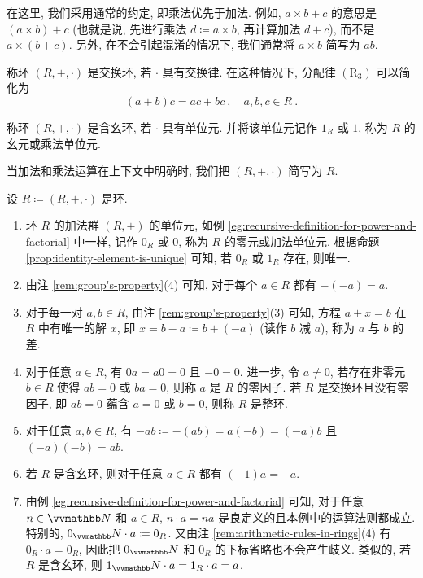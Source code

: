 在这里, 我们采用通常的约定, 即乘法优先于加法. 例如, \(a \times b + c\) 的意思是 \((a \times b) + c\) (也就是说, 先进行乘法 \(d \coloneqq a \times b\), 再计算加法 \(d + c\)), 而不是 \(a \times (b + c)\). 另外, 在不会引起混淆的情况下, 我们通常将 \(a \times b\) 简写为 \(a b\).

\begin{definition}[交换环]
    称环 \((R, +, \cdot)\) 是交换环, 若 \(\cdot\) 具有交换律. 在这种情况下, 分配律 \hyperref[ax:ring]{\((\mathrm R_3)\)} 可以简化为
    \[
        (a + b) c = a c + b c\ ,\quad a, b, c \in R\ .
    \]
\end{definition}

\begin{definition}[含幺环]
    称环 \((R, +, \cdot)\) 是含幺环, 若 \(\cdot\) 具有单位元. 并将该单位元记作 \(1_R\) 或 \(1\), 称为 \(R\) 的幺元或乘法单位元.
\end{definition}

当加法和乘法运算在上下文中明确时, 我们把 \((R, +, \cdot)\) 简写为 \(R\).

\begin{remark}\label{rem:arithmetic-rules-in-rings}
    设 \(R \coloneqq (R, +, \cdot)\) 是环.
    \begin{enumerate}
        \item 环 \(R\) 的加法群 \((R, +)\) 的单位元, 如例 \ref{eg:recursive-definition-for-power-and-factorial} 中一样, 记作 \(0_R\) 或 \(0\), 称为 \(R\) 的零元或加法单位元. 根据命题 \ref{prop:identity-element-is-unique} 可知, 若 \(0_R\) 或 \(1_R\) 存在, 则唯一.
        \item 由注 \ref{rem:group's-property}(4) 可知, 对于每个 \(a \in R\) 都有 \(- (- a) = a\).
        \item 对于每一对 \(a, b \in R\), 由注 \ref{rem:group's-property}(3) 可知, 方程 \(a + x = b\) 在 \(R\) 中有唯一的解 \(x\), 即 \(x = b - a \coloneqq b + (- a)\) (读作 \(b\) 减 \(a\)), 称为 \(a\) 与 \(b\) 的差.
        \item 对于任意 \(a \in R\), 有 \(0 a = a 0 = 0\) 且 \(- 0 = 0\). 进一步, 令 \(a \neq 0\), 若存在非零元 \(b \in R\) 使得 \(a b = 0\) 或 \(b a = 0\), 则称 \(a\) 是 \(R\) 的零因子. 若 \(R\) 是交换环且没有零因子, 即 \(a b = 0\) 蕴含 \(a = 0\) 或 \(b = 0\), 则称 \(R\) 是整环.
        \item 对于任意 \(a, b \in R\), 有 \(- a b \coloneqq - (a b) = a (- b) = (- a) b\) 且 \((- a) (- b) = a b\).
        \item 若 \(R\) 是含幺环, 则对于任意 \(a \in R\) 都有 \((- 1) a = - a\).
        \item 由例 \ref{eg:recursive-definition-for-power-and-factorial} 可知, 对于任意 \(n \in \N\) 和 \(a \in R\), \(n \cdot a = n a\) 是良定义的且本例中的运算法则都成立. 特别的, \(0_\N \cdot a \coloneqq 0_R\). 又由注 \ref{rem:arithmetic-rules-in-rings}(4) 有 \(0_R \cdot a = 0_R\), 因此把 \(0_\N\) 和 \(0_R\) 的下标省略也不会产生歧义. 类似的, 若 \(R\) 是含幺环, 则 \(1_\N \cdot a = 1_R \cdot a = a\).
    \end{enumerate}
\end{remark}

